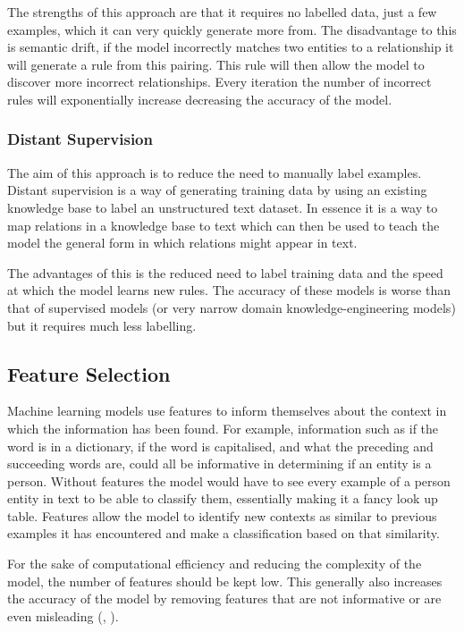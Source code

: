 \documentclass[11pt,oneside]{book}
\begin{document}
The strengths of this approach are that it requires no labelled data, just a few examples, which it can very quickly generate more from. The disadvantage to this is semantic drift, if the model incorrectly matches two entities to a relationship it will generate a rule from this pairing. This rule will then allow the model to discover more incorrect relationships. Every iteration the number of incorrect rules will exponentially increase decreasing the accuracy of the model.

\subsubsection{Distant Supervision}

The aim of this approach is to reduce the need to manually label examples. Distant supervision is a way of generating training data by using an existing knowledge base to label an unstructured text dataset. In essence it is a way to map relations in a knowledge base to text which can then be used to teach the model the general form in which relations might appear in text.

The advantages of this is the reduced need to label training data and the speed at which the model learns new rules. The accuracy of these models is worse than that of supervised models (or very narrow domain knowledge-engineering models) but it requires much less labelling.

\subsection{Feature Selection}

Machine learning models use features to inform themselves about the context in which the information has been found. For example, information such as if the word is in a dictionary, if the word is capitalised, and what the preceding and succeeding words are, could all be informative in determining if an entity is a person. Without features the model would have to see every example of a person entity in text to be able to classify them, essentially making it a fancy look up table. Features allow the model to identify new contexts as similar to previous examples it has encountered and make a classification based on that similarity.

For the sake of computational efficiency and reducing the complexity of the model, the number of features should be kept low. This generally also increases the accuracy of the model by removing features that are not informative or are even misleading (\citet{feature_selection}, \citet{less_features_good}).
\end{document}
